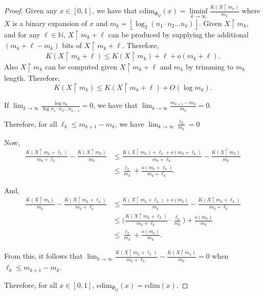\documentclass[11pt]{article}
\newcommand{\floor}[1]{ \left\lfloor #1 \right\rfloor }
\newcommand{\restr}{\upharpoonright}
\newcommand{\N}{\mathbb{N}}
\newcommand{\cdim}{\mathrm{cdim}}
\begin{document}
\begin{proof}
	Given any $x \in [0,1]$, we have that $\cdim_{\Phi_Q}(x)  = \liminf\limits_{k\to\infty} \frac{K(X
		\restr m_k)}{m_k}$ where $X$ is a binary
	expansion of $x$ and $m_k = \floor{\log_2(n_1 \cdot n_2 \dots
		n_k)}.$ Given $X \restr m_k$, and for any $\ell \in \N$, $X \restr m_k + \ell$ can be produced by supplying the additional $(m_{k} + \ell - m_k)$ bits of $X \restr m_k + \ell$. Therefore, $$K(X \restr m_{k} + \ell) \leq K(X \restr m_k) + \ell  + o(m_{k} + \ell).$$
	 Also $X \restr m_k$ can be computed given $X \restr m_k + \ell$ and $m_k$ by trimming to $m_k$ length. Therefore, $$K(X \restr m_k) \leq K(X \restr m_k + \ell) + O(\log m_k).$$
	
	 If $\lim_{k\rightarrow \infty} \frac{\log n_k}{\log n_1 \cdot n_2
		\dots n_{k-1}} = 0$, we have that $\lim_{k\rightarrow \infty} \frac{m_{k+1} - m_{k}}{m_{k}} = 0$. 
	
	Therefore, for all $\ell_k \leq m_{k+1} - m_k$, we have $\lim_{k\rightarrow \infty} \frac{ \ell_k }{m_{k}} = 0$ 
	
	Now,  \begin{align*}
		 \frac{K(X \restr m_{k} + \ell_k)}{m_{k} + \ell_k} - \frac{K(X \restr m_{k})}{m_{k}} &\leq  \frac{K(X \restr m_k) + \ell_k  + o(m_{k} + \ell_k)}{m_{k} + \ell_k} - \frac{K(X \restr m_{k})}{m_{k}} \\
		 &\leq \frac{\ell_k}{m_{k}} + \frac{ o(m_{k} + \ell_k)}{m_{k}+\ell_k}.
	\end{align*}

	And, \begin{align*}
		 \frac{K(X \restr m_{k})}{m_{k}} - \frac{K(X \restr m_{k} + \ell_k)}{m_{k} + \ell_k} &\leq  \frac{K(X \restr m_k + \ell_k) + o(m_k)}{m_{k}} - \frac{K(X \restr m_{k} + \ell_k)}{m_{k} + \ell_k} \\
		&\leq \bigg(\frac{K(X \restr m_{k} + \ell_k)}{m_{k} + \ell_k} \cdot \frac{\ell_k}{m_k} \bigg) + \frac{ o(m_{k} )}{m_{k}} \\
		&\leq \frac{\ell_k}{m_k} + \frac{ o(m_{k} )}{m_{k}}.
	\end{align*}

	From this, it follows that
		$\lim_{k \to \infty} \frac{K(X \restr m_{k} + \ell_k)}{m_{k} + \ell_k} - \frac{K(X \restr m_{k})}{m_{k}}  = 0$ when $\ell_k \leq m_{k+1} - m_k$.
	
	 Therefore,  for all $x \in [0,1]$, $\cdim_{\Phi_Q}(x) = \cdim(x)$.
	 
	
\end{proof}
\end{document}
